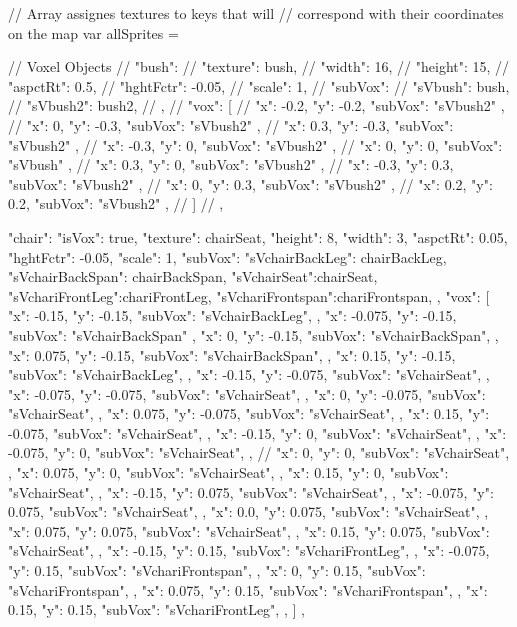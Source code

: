 // Array assignes textures to keys that will
// correspond with their coordinates on the map
var allSprites = {

  // Voxel Objects
  // "bush": {
  //   "texture": bush,
  //   "width": 16,
  //   "height": 15,
  //   "aspctRt": 0.5,
  //   "hghtFctr": -0.05,
  //   "scale": 1,
  //   "subVox": {
  //     "sVbush": bush,
  //     "sVbush2": bush2,
  //   },
  //   "vox": [
  //     { "x": -0.2, "y": -0.2, "subVox": "sVbush2" },
  //     { "x": 0, "y": -0.3, "subVox": "sVbush2" },
  //     { "x": 0.3, "y": -0.3, "subVox": "sVbush2" },
  //     { "x": -0.3, "y": 0, "subVox": "sVbush2" },
  //     { "x": 0, "y": 0, "subVox": "sVbush" },
  //     { "x": 0.3, "y": 0, "subVox": "sVbush2" },
  //     { "x": -0.3, "y": 0.3, "subVox": "sVbush2" },
  //     { "x": 0, "y": 0.3, "subVox": "sVbush2" },
  //     { "x": 0.2, "y": 0.2, "subVox": "sVbush2" },
  //   ]
  // },  

  "chair": {
    "isVox": true,
    "texture": chairSeat,
    "height": 8,
    "width": 3,
    "aspctRt": 0.05,
    "hghtFctr": -0.05,
    "scale": 1,
    "subVox": {
      "sVchairBackLeg": chairBackLeg,
      "sVchairBackSpan": chairBackSpan,
      "sVchairSeat":chairSeat,
      "sVchariFrontLeg":chariFrontLeg,
      "sVchariFrontspan":chariFrontspan,
    },
    "vox": [
      { "x": -0.15, "y": -0.15, "subVox": "sVchairBackLeg", },
      { "x": -0.075, "y": -0.15, "subVox": "sVchairBackSpan" },
      { "x": 0,    "y": -0.15, "subVox": "sVchairBackSpan", },
      { "x": 0.075,  "y": -0.15, "subVox": "sVchairBackSpan", },
      { "x": 0.15,  "y": -0.15, "subVox": "sVchairBackLeg", },
      { "x": -0.15,   "y": -0.075, "subVox": "sVchairSeat", },
      { "x": -0.075,   "y": -0.075, "subVox": "sVchairSeat", },
      { "x": 0,      "y": -0.075, "subVox": "sVchairSeat", },
      { "x": 0.075,    "y": -0.075, "subVox": "sVchairSeat", },
      { "x": 0.15,    "y": -0.075, "subVox": "sVchairSeat", },
      { "x": -0.15,  "y": 0, "subVox": "sVchairSeat", },
      { "x": -0.075,  "y": 0, "subVox": "sVchairSeat", },
      // { "x": 0,     "y": 0, "subVox": "sVchairSeat", },
      { "x": 0.075,   "y": 0, "subVox": "sVchairSeat", },
      { "x": 0.15,   "y": 0, "subVox": "sVchairSeat", },
      { "x": -0.15,  "y": 0.075, "subVox": "sVchairSeat", },
      { "x": -0.075,  "y": 0.075, "subVox": "sVchairSeat", },
      { "x": 0.0,   "y": 0.075, "subVox": "sVchairSeat", },
      { "x": 0.075,   "y": 0.075, "subVox": "sVchairSeat", },
      { "x": 0.15,   "y": 0.075, "subVox": "sVchairSeat", },
      { "x": -0.15, "y": 0.15, "subVox": "sVchariFrontLeg", },
      { "x": -0.075, "y": 0.15, "subVox": "sVchariFrontspan", },
      { "x": 0,    "y": 0.15, "subVox": "sVchariFrontspan", },
      { "x": 0.075,  "y": 0.15, "subVox": "sVchariFrontspan", },
      { "x": 0.15,  "y": 0.15, "subVox": "sVchariFrontLeg", },
    ]
  },  


}
